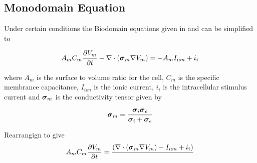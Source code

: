 
\subsection{Monodomain Equation}

Under certain conditions the Biodomain equations given in
 and  can be simplified to 

\begin{equation}
  A_{m}C_{m}\delby{V_{m}}{t}-\divergence{}{\pbrac{\tensor{\sigma}_{m}\grad{V_{m}}}}=-A_{m}I_{ion}+i_{i}
  \label{eqn:monodomain}
\end{equation}

where $A_{m}$ is the surface to volume ratio for the cell, $C_{m}$ is
the specific membrance capacitance, $I_{ion}$ is the ionic current, $i_{i}$ is the
intracellular stimulus current and $\boldsymbol{\mathit{\sigma}}_{m}$ is the
conductivity tensor given by

\begin{equation}
  \tensor{\sigma}_{m}=\dfrac{\tensor{\sigma}_{i}\tensor{\sigma}_{e}}{\tensor{\sigma}_{i}+\tensor{\sigma}_{e}}
  \label{eqn:monodomainconductivity}
\end{equation}

Rearrangign  to give
\begin{equation}
  A_{m}C_{m}\delby{V_{m}}{t}=\dfrac{\pbrac{\divergence{}{\pbrac{\tensor{\sigma}_{m}\grad{V_{m}}}}-I_{ion}+i_{i}}}{}
\end{equation}
